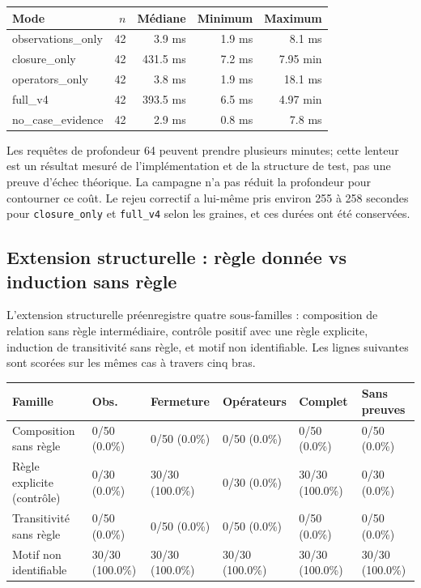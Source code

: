 \documentclass[11pt,a4paper]{article}
\begin{document}
\begin{longtable}{lrrrr}
\toprule Mode & $n$ & Médiane & Minimum & Maximum \\
\midrule

observations\_only & 42 & 3.9 ms & 1.9 ms & 8.1 ms \\
closure\_only & 42 & 431.5 ms & 7.2 ms & 7.95 min \\
operators\_only & 42 & 3.8 ms & 1.9 ms & 18.1 ms \\
full\_v4 & 42 & 393.5 ms & 6.5 ms & 4.97 min \\
no\_case\_evidence & 42 & 2.9 ms & 0.8 ms & 7.8 ms \\
\bottomrule
\end{longtable}

Les requêtes de profondeur 64 peuvent prendre plusieurs minutes; cette lenteur est un résultat mesuré de l’implémentation et de la structure de test, pas une preuve d’échec théorique. La campagne n’a pas réduit la profondeur pour contourner ce coût. Le rejeu correctif a lui-même pris environ 255 à 258 secondes pour \texttt{closure\_only} et \texttt{full\_v4} selon les graines, et ces durées ont été conservées.

\subsection{Extension structurelle : règle donnée vs induction sans règle}
L’extension structurelle préenregistre quatre sous-familles : composition de relation sans règle intermédiaire, contrôle positif avec une règle explicite, induction de transitivité sans règle, et motif non identifiable. Les lignes suivantes sont scorées sur les mêmes cas à travers cinq bras.
\scriptsize\setlength{\tabcolsep}{1.5pt}
\begin{longtable}{p{}p{}p{}p{}p{}p{}}
\toprule Famille & Obs. & Fermeture & Opérateurs & Complet & Sans preuves \\
\midrule

Composition sans règle & 0/50 (0.0\%) & 0/50 (0.0\%) & 0/50 (0.0\%) & 0/50 (0.0\%) & 0/50 (0.0\%) \\
Règle explicite (contrôle) & 0/30 (0.0\%) & 30/30 (100.0\%) & 0/30 (0.0\%) & 30/30 (100.0\%) & 0/30 (0.0\%) \\
Transitivité sans règle & 0/50 (0.0\%) & 0/50 (0.0\%) & 0/50 (0.0\%) & 0/50 (0.0\%) & 0/50 (0.0\%) \\
Motif non identifiable & 30/30 (100.0\%) & 30/30 (100.0\%) & 30/30 (100.0\%) & 30/30 (100.0\%) & 30/30 (100.0\%) \\
\bottomrule
\end{longtable}
\normalsize\setlength{\tabcolsep}{6pt}
\end{document}
